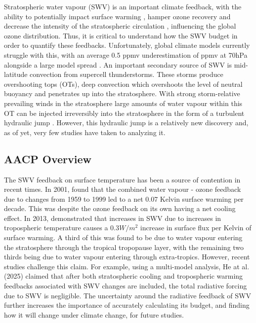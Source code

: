 \documentclass[12pt]{article}
\begin{document}
Stratospheric water vapour (SWV) is an important climate feedback, with the ability to potentially impact surface warming \cite{dessler_stratospheric_2013}, hamper ozone recovery \cite{shindell_climate_2001} and decrease the intensity of the stratospheric circulation \cite{veenus_observational_2025}, influencing the global ozone distribution. Thus, it is critical to understand how the SWV budget in order to quantify these feedbacks. Unfortunately, global climate models currently struggle with this, with an average 0.5 ppmv underestimation of ppmv at 70hPa alongside a large model spread \cite{keeble_evaluating_2021}. An important secondary source of SWV is mid-latitude convection from supercell thunderstorms. These storms produce overshooting tops (OTs), deep convection which overshoots the level of neutral buoyancy and penetrates up into the stratosphere. With strong storm-relative prevailing winds in the stratosphere large amounts of water vapour within this OT can be injected irreversibly into the stratosphere in the form of a turbulent hydraulic jump \cite{oneill_hydraulic_2021}. However, this hydraulic jump is a relatively new discovery and, as of yet, very few studies have taken to analyzing it. 

\subsection{AACP Overview}

The SWV feedback on surface temperature has been a source of contention in recent times. In 2001, \cite{shindell_climate_2001} found that the combined water vapour - ozone feedback due to changes from 1959 to 1999 led to a net 0.07 Kelvin surface warming per decade. This was despite the ozone feedback on its own having a net cooling effect. In 2013, \cite{dessler_stratospheric_2013} demonstrated that increases in SWV due to increases in tropospheric temperature causes a $0.3 W/m^2$ increase in surface flux per Kelvin of surface warming. A third of this was found to be due to water vapour entering the stratosphere through the tropical tropopause layer, with the remaining two thirds being due to water vapour entering through extra-tropics. However, recent studies challenge this claim. For example, using a multi-model analysis, He at al. (2025) \cite{he_muted_2025} claimed that after both stratospheric cooling and tropospheric warming feedbacks associated with SWV changes are included, the total radiative forcing due to SWV is negligible. The uncertainty around the radiative feedback of SWV further increases the importance of accurately calculating its budget, and finding how it will change under climate change, for future studies.
\end{document}
